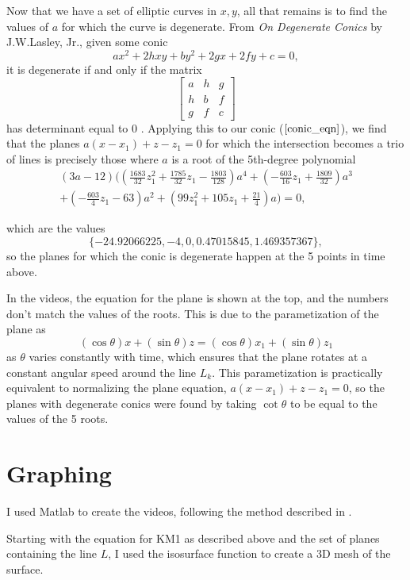 \documentclass{article}
\begin{document}
	Now that we have a set of elliptic curves in $x,y$, all that remains is to find the values of $a$ for which the curve is degenerate. From \textit{On Degenerate Conics} by J.W.Lasley, Jr., given some conic 
	\[ ax^2 + 2hxy + by^2 + 2gx + 2fy + c = 0, \]
	it is degenerate if and only if the matrix
	\[ \begin{bmatrix} a & h & g \\ h & b & f \\ g & f & c \end{bmatrix} \]
	has determinant equal to 
	0 \cite{10.2307/2309606}. Applying this to our conic ($\ref{conic_eqn}$), we find that the planes $a(x-x_1) + z-z_1 = 0$ for which the intersection becomes a trio of lines is precisely those where $a$ is a root of the 5th-degree polynomial
	\begin{multline*}
	\left( 3a-12 \right) \big( \left( \tfrac{1683}{32}z_1^2+\tfrac{1785}{32}z_1-\tfrac{1803}{128}  \right) a^4+ \left( -\tfrac{603}{16}z_1+\tfrac{1809}{32} \right) a^3\\
	+ \left(-\tfrac{603}{4}z_1-63 \right)a^2+ \left(99z_1^2+105z_1+\tfrac{21}{4} \right) a \big) = 0, 
	\end{multline*}
	
	which are the values
	\[ \{ -24.92066225, -4, 0, 0.47015845, 1.469357367 \}, \]
	so the planes for which the conic is degenerate happen at the 5 points in time above. 
	
	In the videos, the equation for the plane is shown at the top, and the numbers don't match the values of the roots. This is due to the parametization of the plane as
	\[ \left( \cos \theta \right) x + \left( \sin \theta \right) z = \left( \cos \theta \right) x_1 + \left( \sin \theta \right) z_1 \]
	as $\theta$ varies constantly with time, which ensures that the plane rotates at a constant angular speed around the line $L_k$. This parametization is practically equivalent to normalizing the plane equation, $a(x-x_1) + z-z_1 = 0$, so the planes with degenerate conics were found by taking $\cot \theta$ to be equal to the values of the 5 roots. 

	\newpage
	\section{Graphing}
	I used Matlab to create the videos, following the method described in \cite{isosurface}.
	
	Starting with the equation for KM1 as described above and the set of planes containing the line $L$, I used the isosurface function to create a 3D mesh of the surface.

	
\end{document}
